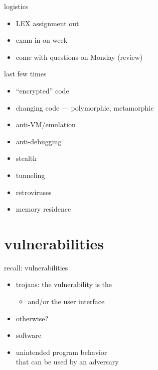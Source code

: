 \begin{frame}
    \titlepage
\end{frame}

\begin{frame}{logistics}
    \begin{itemize}
    \item LEX assignment out
    \item exam in on week
    \item come with questions on Monday (review)
    \end{itemize}
\end{frame}

\begin{frame}{last few times}
    \begin{itemize}
    \item ``encrypted'' code
    \item changing code --- polymorphic, metamorphic
    \item anti-VM/emulation
    \item anti-debugging
    \item stealth
    \item tunneling
    \item retroviruses
    \item memory residence
    \end{itemize}
\end{frame}

\section{vulnerabilities}

\begin{frame}{recall: vulnerabilities}
    \begin{itemize}
    \item trojans: the vulnerability is the 
        \begin{itemize}
        \item and/or the user interface
        \end{itemize}
    \item otherwise?
    \item software 
    \vspace{.5cm}
    \item unintended program behavior \\ that can be used by an adversary
    \end{itemize}
\end{frame}

